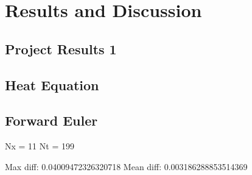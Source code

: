 \section{Results and Discussion}\label{sec:Results}

\subsection{Project Results 1}\label{sec:project results}

\subsection{Heat Equation}\label{sec:heateq results}

\subsection{Forward Euler}
Nx = 11
Nt = 199

Max diff: 0.04009472326320718
Mean diff: 0.003186288853514369

